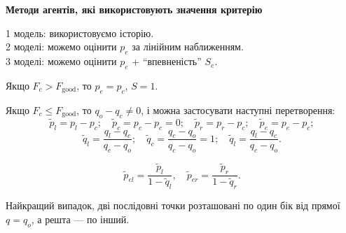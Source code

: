 \documentclass[14pt,handout,utf8]{beamer}
\newcommand{\Xhead}[1]{
 \begin{center}%
      \textbf{#1}%
 \end{center}%
}
\begin{document}

\begin{frame}
  \frametitle{~}

  \Xhead{Методи агентів, які використовують значення критерію}

  1 модель: використовуємо історію. \\
  2 моделі: можемо оцінити $p_e$ за лінійним наближенням. \\
  3 моделі: можемо оцінити $p_e$ + ``впевненість'' $S_e$.

  Якщо
  $F_c > F_\mathrm{good}$, то $p_e = p_c$, $S=1$.

  Якщо
  $F_c \le F_\mathrm{good}$, то $q_o -q_c \ne 0$,
  і можна застосувати наступні перетворення:
  \[
    \tilde{p}_l = p_l - p_c;
  \quad
  \tilde{p}_c = p_c - p_c = 0;
  \quad
  \tilde{p}_r = p_r - p_c;
  \quad
  \tilde{p}_e = p_e - p_c;
\]
  \begin{equation}
    \tilde{q}_l = \frac{q_l-q_c}{q_c-q_o};
    \quad
    \tilde{q}_c = \frac{q_c-q_o}{q_c-q_o} = 1;
    \quad
    \tilde{q}_l = \frac{q_l-q_c}{q_c-q_o}.
    \label{atu:eq:q_agent_rel}
  \end{equation}

  \begin{equation}
    \tilde{p}_{el} = \frac{\tilde{p}_l}{1-\tilde{q}_l},
    \quad
    \tilde{p}_{er} = \frac{\tilde{p}_r}{1-\tilde{q}_r}.
    \label{atu:eq:pr_ex}
  \end{equation}

  Найкращий випадок,  дві послідовні точки
  розташовані по один бік
  від прямої
  $q = q_o$, а решта --- по інший.


\end{frame}
\end{document}

